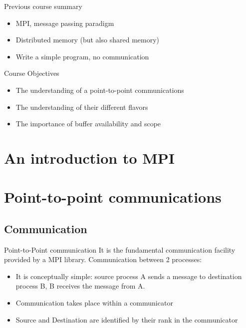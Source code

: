 \documentclass[aspectratio=43]{beamer}
\begin{document}
\cscstitle

\begin{frame}{Previous course summary}
\begin{itemize}
\item MPI, message passing paradigm
\item Distributed memory (but also shared memory)
\item Write a simple program, no communication
\end{itemize}
\end{frame}

\begin{frame}{Course Objectives}
\begin{itemize}
\item The understanding of a point-to-point communications
\item The understanding of their different flavors
\item The importance of buffer availability and scope
\end{itemize}
\end{frame}


\section{An introduction to MPI}
\section{Point-to-point communications}


\subsection{Communication}

\begin{frame}{Point-to-Point communication}
It is the fundamental communication facility provided by a MPI library.
Communication between 2 processes:
\begin{itemize}
\item It is conceptually simple: source process A sends a message to destination process B, B receives the message from A.
\item Communication takes place within a communicator
\item Source and Destination are identified by their rank in the communicator
\end{itemize}
\end{frame}
\end{document}
